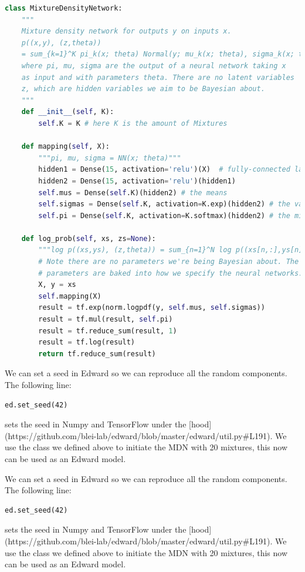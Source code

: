 \begin{lstlisting}[language=Python]
class MixtureDensityNetwork:
    """
    Mixture density network for outputs y on inputs x.
    p((x,y), (z,theta))
    = sum_{k=1}^K pi_k(x; theta) Normal(y; mu_k(x; theta), sigma_k(x; theta))
    where pi, mu, sigma are the output of a neural network taking x
    as input and with parameters theta. There are no latent variables
    z, which are hidden variables we aim to be Bayesian about.
    """
    def __init__(self, K):
        self.K = K # here K is the amount of Mixtures

    def mapping(self, X):
        """pi, mu, sigma = NN(x; theta)"""
        hidden1 = Dense(15, activation='relu')(X)  # fully-connected layer with 15 hidden units
        hidden2 = Dense(15, activation='relu')(hidden1)
        self.mus = Dense(self.K)(hidden2) # the means
        self.sigmas = Dense(self.K, activation=K.exp)(hidden2) # the variance
        self.pi = Dense(self.K, activation=K.softmax)(hidden2) # the mixture components

    def log_prob(self, xs, zs=None):
        """log p((xs,ys), (z,theta)) = sum_{n=1}^N log p((xs[n,:],ys[n]), theta)"""
        # Note there are no parameters we're being Bayesian about. The
        # parameters are baked into how we specify the neural networks.
        X, y = xs
        self.mapping(X)
        result = tf.exp(norm.logpdf(y, self.mus, self.sigmas))
        result = tf.mul(result, self.pi)
        result = tf.reduce_sum(result, 1)
        result = tf.log(result)
        return tf.reduce_sum(result)
\end{lstlisting}

We can set a seed in Edward so we can reproduce all the random components. The following line:

\begin{lstlisting}
ed.set_seed(42)
\end{lstlisting}

sets the seed in Numpy and TensorFlow under the [hood](https://github.com/blei-lab/edward/blob/master/edward/util.py#L191). We use the class we defined above to initiate the MDN with 20 mixtures, this now can be used as an Edward model.

We can set a seed in Edward so we can reproduce all the random components. The following line:

\begin{lstlisting}
ed.set_seed(42)
\end{lstlisting}

sets the seed in Numpy and TensorFlow under the [hood](https://github.com/blei-lab/edward/blob/master/edward/util.py#L191). We use the class we defined above to initiate the MDN with 20 mixtures, this now can be used as an Edward model.


